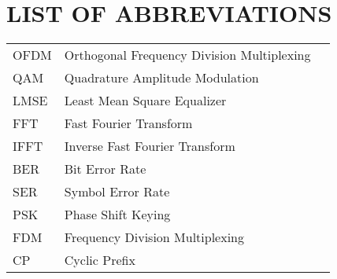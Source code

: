 \section*{LIST OF ABBREVIATIONS}
 {}

\begin{tabularx}{\textwidth}{ L{0.4} L{1.3} L{1.3} }
    OFDM & Orthogonal Frequency Division Multiplexing \\
    QAM & Quadrature Amplitude Modulation \\
    LMSE & Least Mean Square Equalizer \\ %
    FFT & Fast Fourier Transform \\
    IFFT & Inverse Fast Fourier Transform \\
    BER & Bit Error Rate \\
    SER & Symbol Error Rate \\
    PSK & Phase Shift Keying \\
    FDM & Frequency Division Multiplexing \\
    CP & Cyclic Prefix \\
\end{tabularx}

\newpage